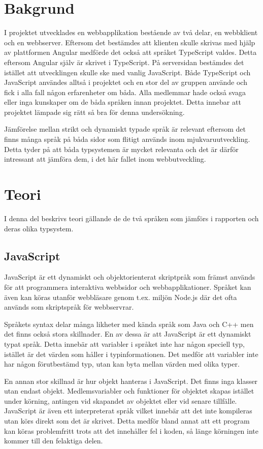 \section{Bakgrund}
I projektet utvecklades en webbapplikation bestående av två delar, en webbklient och en webbserver. Eftersom det bestämdes att klienten skulle skrivas med hjälp av plattformen Angular medförde det också att språket TypeScript valdes. Detta eftersom Angular själv är skrivet i TypeScript. På serversidan bestämdes det istället att utvecklingen skulle ske med vanlig JavaScript. Både TypeScript och JavaScript användes alltså i projektet och en stor del av gruppen använde och fick i alla fall någon erfarenheter om båda. Alla medlemmar hade också svaga eller inga kunskaper om de båda språken innan projektet. Detta innebar att projektet lämpade sig rätt så bra för denna undersökning.

Jämförelse mellan strikt och dynamiskt typade språk är relevant eftersom det finns många språk på båda sidor som flitigt används inom mjukvaruutveckling. Detta tyder på att båda typsystemen är mycket relevanta och det är därför intressant att jämföra dem, i det här fallet inom webbutveckling.
\section{Teori}
I denna del beskrivs teori gällande de de två språken som jämförs i rapporten och deras olika typsystem.
\subsection{JavaScript}
JavaScript är ett dynamiskt och objektorienterat skriptpråk som främst används för att programmera interaktiva webbsidor och webbapplikationer. Språket kan även kan köras utanför webbläsare genom t.ex. miljön Node.js där det ofta används som skriptspråk för webbservrar. \cite{henrik_js1}

Språkets syntax delar många likheter med kända språk som Java och C++ men det finns också stora skillnader. En av dessa är att JavaScript är ett dynamiskt typat språk. Detta innebär att variabler i språket inte har någon speciell typ, istället är det värden som håller i typinformationen. Det medför att variabler inte har någon förutbestämd typ, utan kan byta mellan värden med olika typer. \cite{henrik_js2}

En annan stor skillnad är hur objekt hanteras i JavaScript. Det finns inga klasser utan endast objekt. Medlemsvariabler och funktioner för objektet skapas istället under körning, antingen vid skapandet av objektet eller vid senare tillfälle. \cite{henrik_js3}
JavaScript är även ett interpreterat språk \cite{henrik_js1} vilket innebär att det inte kompileras utan körs direkt som det är skrivet. Detta medför bland annat att ett program kan köras problemfritt trots att det innehåller fel i koden, så länge körningen inte kommer till den felaktiga delen.
